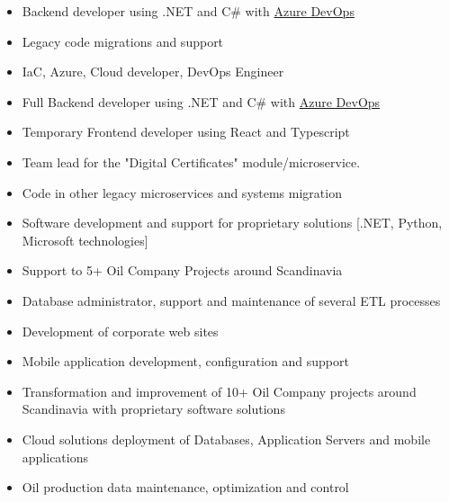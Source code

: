 
\begin{itemize}
    \item Backend developer using .NET and C\# with \href{dev.azure.com}{Azure DevOps} 
    \item Legacy code migrations and support
    \item IaC, Azure, Cloud developer, DevOps Engineer
\end{itemize}

\divider


\begin{itemize}
    \item Full Backend developer using .NET and C\# with \href{dev.azure.com}{Azure DevOps} 
    \item Temporary Frontend developer using React and Typescript
    \item Team lead for the "Digital Certificates"  module/microservice.
    \item Code in other legacy microservices and systems migration
\end{itemize}

\divider

\begin{itemize}
\item Software development and support for proprietary solutions [.NET, Python, Microsoft technologies]
\item Support to 5+ Oil Company Projects around Scandinavia
\item Database administrator, support and maintenance of several ETL processes
\item Development of corporate web sites
\item Mobile application development, configuration and support
\end{itemize}

\divider

\begin{itemize}
\item Transformation and improvement of 10+ Oil Company projects around Scandinavia with proprietary software solutions
\item Cloud solutions deployment of Databases, Application Servers and mobile applications
\item Oil production data maintenance, optimization and control
\end{itemize}

